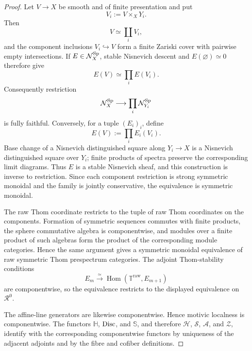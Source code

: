 \begin{proof}
Let \(V\to X\) be smooth and of finite presentation and put
\[
  V_i:=V\times_XY_i.
\]
Then
\[
  V\simeq\coprod_iV_i,
\]
and the component inclusions \(V_i\hookrightarrow V\) form a finite Zariski
cover with pairwise empty intersections.  If \(E\in\mathcal N_X^{\mathrm{Sp}}\), stable
Nisnevich descent and \(E(\varnothing)\simeq0\) therefore give
\[
  E(V)\simeq\prod_iE(V_i).
\]
Consequently restriction
\[
  \mathcal N_X^{\mathrm{Sp}}\longrightarrow\prod_i\mathcal N_{Y_i}^{\mathrm{Sp}}
\]
is fully faithful.  Conversely, for a tuple \((E_i)_i\), define
\[
  E(V):=\prod_iE_i(V_i).
\]
Base change of a Nisnevich distinguished square along \(Y_i\to X\) is a
Nisnevich distinguished square over \(Y_i\); finite products of spectra
preserve the corresponding limit diagrams.  Thus \(E\) is a stable
Nisnevich sheaf, and this construction is inverse to restriction.  Since each
component restriction is strong symmetric monoidal and the family is jointly
conservative, the equivalence is symmetric monoidal.

The raw Thom coordinate restricts to the tuple of raw Thom coordinates on the
components.  Formation of symmetric sequences commutes with finite products,
the sphere commutative algebra is componentwise, and modules over a finite
product of such algebras form the product of the corresponding module
categories.  Hence the same argument gives a symmetric monoidal equivalence of
raw symmetric Thom prespectrum categories.  The adjoint Thom-stability
conditions
\[
  E_m\xrightarrow{\simeq}
  \operatorname{Hom}(\mathbb T^{\mathrm{raw}},E_{m+1})
\]
are componentwise, so the equivalence restricts to the displayed equivalence
on \(\mathcal R^0\).

The affine-line generators are likewise componentwise.  Hence motivic
localness is componentwise.  The functors \(\mathbb H\), \(\operatorname{Disc}\), and
\(\mathbb S\), and therefore \(\mathcal H\), \(\mathcal S\),
\(\mathcal A\), and \(\mathcal Z\), identify with the corresponding
componentwise functors by uniqueness of the adjacent adjoints and by the fibre
and cofiber definitions.
\end{proof}

